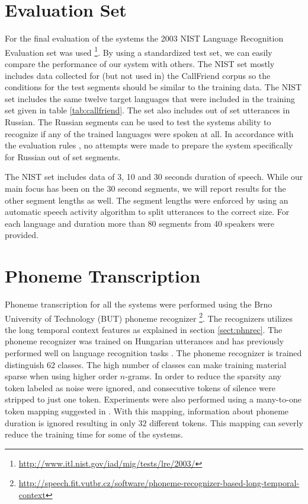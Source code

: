 \section{Evaluation Set}

For the final evaluation of the systems the 2003 NIST Language Recognition Evaluation set was used \footnote{\url{http://www.itl.nist.gov/iad/mig/tests/lre/2003/}}. By using a standardized test set, we can easily compare the performance of our system with others. The NIST set mostly includes data collected for (but not used in) the CallFriend corpus \cite{martin2003nist} so the conditions for the test segments should be similar to the training data. The NIST set includes the same twelve target languages that were included in the training set given in table \ref{tab:callfriend}. The set also includes out of set utterances in Russian. The Russian segments can be used to test the systems ability to recognize if any of the trained languages were spoken at all. In accordance with the evaluation rules \cite{martin2003nist}, no attempts were made to prepare the system specifically for Russian out of set segments.

The NIST set includes data of 3, 10 and 30 seconds duration of speech. While our main focus has been on the 30 second segments, we will report results for the other segment lengths as well. The segment lengths were enforced by using an automatic speech activity algorithm to split utterances to the correct size. For each language and duration more than 80 segments from 40 speakers were provided. 

\section{Phoneme Transcription}

Phoneme transcription for all the systems were performed using the Brno University of Technology (BUT) phoneme recognizer \footnote{\url{http://speech.fit.vutbr.cz/software/phoneme-recognizer-based-long-temporal-context}}. The recognizers utilizes the long temporal context features as explained in section \ref{sect:phnrec}. The phoneme recognizer was trained on Hungarian utterances and has previously performed well on language recognition tasks \cite{lrivector, torres2008mitll}. The phoneme recognizer is trained distinguish $62$ classes. The high number of classes can make training material sparse when using higher order $n$-grams. In order to reduce the sparsity any token labeled as noise were ignored, and consecutive tokens of silence were stripped to just one token. Experiments were also performed using a many-to-one token mapping suggested in \cite{torres2008mitll}. With this mapping, information about phoneme duration is ignored resulting in only $32$ different tokens. This mapping can severly reduce the training time for some of the systems.

